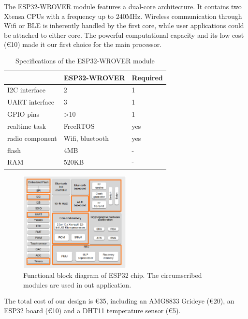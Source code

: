 The ESP32-WROVER module features a dual-core architecture. It contains two Xtensa CPUs \cite{xtensa} with a frequency up to 240MHz. Wireless communication through Wifi or BLE is inherently handled by the first core, while user applications could be attached to either core. The powerful computational capacity and its low cost (€10) made it our first choice for the main processor.
\begin{table}
  \centering
\begin{tabular}{l|ll}
                & ESP32-WROVER     & Required \\ \hline
I2C interface   & 2                & 1        \\
UART interface  & 3                & 1        \\
GPIO pins       & \textgreater{}10 & 1        \\
realtime task   & FreeRTOS         & yes      \\
radio component & Wifi, bluetooth  & yes      \\
flash           & 4MB              & -        \\
RAM             & 520KB            & -
\end{tabular}
  \caption{Specifications of the ESP32-WROVER module}\label{tab:esp32wrover}
\end{table}
\begin{figure}
  \centering
  \includegraphics[width=0.5\textwidth]{figures/ESP32diagram.PNG}
  \caption{Functional block diagram of ESP32 chip. The circumscribed modules are used in out application.}\label{fig:ESP32diagram}
\end{figure}


The total cost of our design is €35, including an AMG8833 Grideye (€20), an ESP32 board (€10) and a DHT11 temperature sensor (€5).

